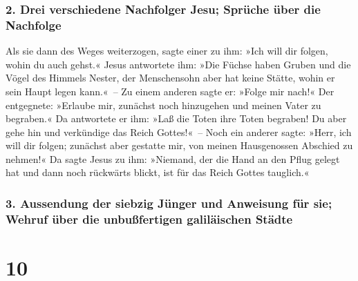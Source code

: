 \hypertarget{drei-verschiedene-nachfolger-jesu-spruxfcche-uxfcber-die-nachfolge}{%
\subsubsection{2. Drei verschiedene Nachfolger Jesu; Sprüche über die
Nachfolge}\label{drei-verschiedene-nachfolger-jesu-spruxfcche-uxfcber-die-nachfolge}}

 Als sie dann des Weges weiterzogen, sagte einer zu ihm:
»Ich will dir folgen, wohin du auch gehst.«  Jesus
antwortete ihm: »Die Füchse haben Gruben und die Vögel des Himmels
Nester, der Menschensohn aber hat keine Stätte, wohin er sein Haupt
legen kann.«~--  Zu einem anderen sagte er: »Folge mir
nach!« Der entgegnete: »Erlaube mir, zunächst noch hinzugehen und meinen
Vater zu begraben.«  Da antwortete er ihm: »Laß die Toten
ihre Toten begraben! Du aber gehe hin und verkündige das Reich
Gottes!«~--  Noch ein anderer sagte: »Herr, ich will dir
folgen; zunächst aber gestatte mir, von meinen Hausgenossen Abschied zu
nehmen!«  Da sagte Jesus zu ihm: »Niemand, der die Hand
an den Pflug gelegt hat und dann noch rückwärts blickt, ist für das
Reich Gottes tauglich.«

\hypertarget{aussendung-der-siebzig-juxfcnger-und-anweisung-fuxfcr-sie-wehruf-uxfcber-die-unbuuxdffertigen-galiluxe4ischen-stuxe4dte}{%
\subsubsection{3. Aussendung der siebzig Jünger und Anweisung für sie;
Wehruf über die unbußfertigen galiläischen
Städte}\label{aussendung-der-siebzig-juxfcnger-und-anweisung-fuxfcr-sie-wehruf-uxfcber-die-unbuuxdffertigen-galiluxe4ischen-stuxe4dte}}

\hypertarget{section-9}{%
\section{10}\label{section-9}}

